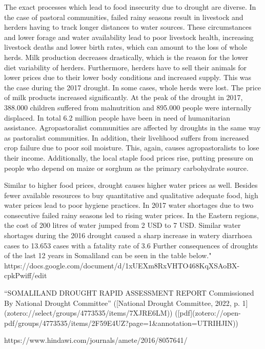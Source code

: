 {{The exact processes which lead to food insecurity due to drought are diverse. In the case of pastoral communities, failed rainy seasons result in livestock and herders having to track longer distances to water sources. These circumstances and lower forage and water availability lead to poor livestock health, increasing livestock deaths and lower birth rates, which can amount to the loss of whole herds. Milk production decreases drastically, which is the reason for the lower diet variability of herders. Furthermore, herders have to sell their animals for lower prices due to their lower body conditions and increased supply. This was the case during the 2017 drought. In some cases, whole herds were lost. The price of milk products increased significantly. At the peak of the drought in 2017, 388.000 children suffered from malnutrition and 895.000 people were internally displaced. In total 6.2 million people have been in need of humanitarian assistance.
Agropastoralist communities are affected by droughts in the same way as pastoralist communities. In addition, their livelihood suffers from increased crop failure due to poor soil moisture. This, again, causes agropastoralists to lose their income. Additionally, the local staple food prices rise, putting pressure on people who depend on maize or sorghum as the primary carbohydrate source. 

Similar to higher food prices, drought causes higher water prices as well. Besides fewer available resources to buy quantitative and qualitative adequate food, high water prices lead to poor hygiene practices. In 2017 water shortages due to two consecutive failed rainy seasons led to rising water prices. In the Eastern regions, the cost of 200 litres of water jumped from 2 USD to 7 USD. Similar water shortages during the 2016 drought caused a sharp increase in watery diarrhoea cases to 13.653 cases with a fatality rate of 3.6 %
Further consequences of droughts of the last 12 years in Somaliland can be seen in the table below."
https://docs.google.com/document/d/1xUEXm8RxVHTO468KqXSAoBX-cpkPwiff/edit

“SOMALILAND DROUGHT RAPID ASSESSMENT REPORT Commissioned By National Drought Committee” ([National Drought Committee, 2022, p. 1](zotero://select/groups/4773535/items/7XJRE6LM)) ([pdf](zotero://open-pdf/groups/4773535/items/2F59E4UZ?page=1&annotation=UTRIHJIN))

https://www.hindawi.com/journals/amete/2016/8057641/

}}
